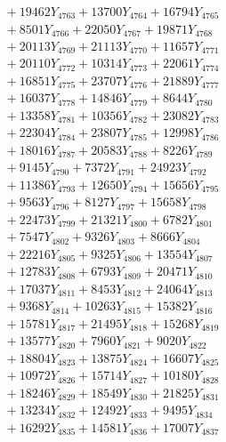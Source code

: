 \documentclass[a4paper,10pt]{article}
\begin{document}
{\begin{align}
&\;  + 19462 Y_{4763} + 13700 Y_{4764} + 16794 Y_{4765} \\[0.3ex]
&\;  + 8501 Y_{4766} + 22050 Y_{4767} + 19871 Y_{4768} \\[0.5ex]\allowbreak
&\;  + 20113 Y_{4769} + 21113 Y_{4770} + 11657 Y_{4771} \\[0.3ex]
&\;  + 20110 Y_{4772} + 10314 Y_{4773} + 22061 Y_{4774} \\[0.3ex]
&\;  + 16851 Y_{4775} + 23707 Y_{4776} + 21889 Y_{4777} \\[0.3ex]
&\;  + 16037 Y_{4778} + 14846 Y_{4779} + 8644 Y_{4780} \\[0.3ex]
&\;  + 13358 Y_{4781} + 10356 Y_{4782} + 23082 Y_{4783} \\[0.3ex]
&\;  + 22304 Y_{4784} + 23807 Y_{4785} + 12998 Y_{4786} \\[0.3ex]
&\;  + 18016 Y_{4787} + 20583 Y_{4788} + 8226 Y_{4789} \\[0.3ex]
&\;  + 9145 Y_{4790} + 7372 Y_{4791} + 24923 Y_{4792} \\[0.3ex]
&\;  + 11386 Y_{4793} + 12650 Y_{4794} + 15656 Y_{4795} \\[0.3ex]
&\;  + 9563 Y_{4796} + 8127 Y_{4797} + 15658 Y_{4798} \\[0.5ex]\allowbreak
&\;  + 22473 Y_{4799} + 21321 Y_{4800} + 6782 Y_{4801} \\[0.3ex]
&\;  + 7547 Y_{4802} + 9326 Y_{4803} + 8666 Y_{4804} \\[0.3ex]
&\;  + 22216 Y_{4805} + 9325 Y_{4806} + 13554 Y_{4807} \\[0.3ex]
&\;  + 12783 Y_{4808} + 6793 Y_{4809} + 20471 Y_{4810} \\[0.3ex]
&\;  + 17037 Y_{4811} + 8453 Y_{4812} + 24064 Y_{4813} \\[0.3ex]
&\;  + 9368 Y_{4814} + 10263 Y_{4815} + 15382 Y_{4816} \\[0.3ex]
&\;  + 15781 Y_{4817} + 21495 Y_{4818} + 15268 Y_{4819} \\[0.3ex]
&\;  + 13577 Y_{4820} + 7960 Y_{4821} + 9020 Y_{4822} \\[0.3ex]
&\;  + 18804 Y_{4823} + 13875 Y_{4824} + 16607 Y_{4825} \\[0.3ex]
&\;  + 10972 Y_{4826} + 15714 Y_{4827} + 10180 Y_{4828} \\[0.5ex]\allowbreak
&\;  + 18246 Y_{4829} + 18549 Y_{4830} + 21825 Y_{4831} \\[0.3ex]
&\;  + 13234 Y_{4832} + 12492 Y_{4833} + 9495 Y_{4834} \\[0.3ex]
&\;  + 16292 Y_{4835} + 14581 Y_{4836} + 17007 Y_{4837} \\[0.3ex]

\end{align}}
\end{document}
